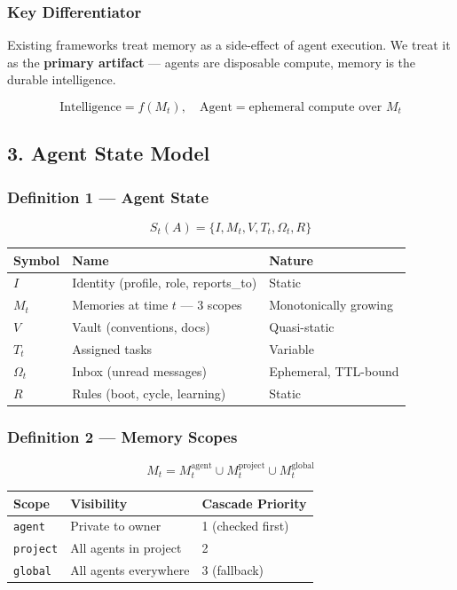 \documentclass[11pt]{article}
\begin{document}
\subsubsection{Key Differentiator}\label{key-differentiator}

Existing frameworks treat memory as a side-effect of agent execution. We
treat it as the \textbf{primary artifact} --- agents are disposable
compute, memory is the durable intelligence.

\[\text{Intelligence} = f(M_t), \quad \text{Agent} = \text{ephemeral compute over } M_t\]

    \subsection{3. Agent State Model}\label{agent-state-model}

\subsubsection{Definition 1 --- Agent
State}\label{definition-1-agent-state}

\[S_t(A) = \{ I, M_t, V, T_t, \Omega_t, R \}\]

\begin{longtable}[]{@{}lll@{}}
\toprule\noalign{}
Symbol & Name & Nature \\
\midrule\noalign{}
\endhead
\bottomrule\noalign{}
\endlastfoot
\(I\) & Identity (profile, role, reports\_to) & Static \\
\(M_t\) & Memories at time \(t\) --- 3 scopes & Monotonically growing \\
\(V\) & Vault (conventions, docs) & Quasi-static \\
\(T_t\) & Assigned tasks & Variable \\
\(\Omega_t\) & Inbox (unread messages) & Ephemeral, TTL-bound \\
\(R\) & Rules (boot, cycle, learning) & Static \\
\end{longtable}

\subsubsection{Definition 2 --- Memory
Scopes}\label{definition-2-memory-scopes}

\[M_t = M_t^{\text{agent}} \cup M_t^{\text{project}} \cup M_t^{\text{global}}\]

\begin{longtable}[]{@{}lll@{}}
\toprule\noalign{}
Scope & Visibility & Cascade Priority \\
\midrule\noalign{}
\endhead
\bottomrule\noalign{}
\endlastfoot
\texttt{agent} & Private to owner & 1 (checked first) \\
\texttt{project} & All agents in project & 2 \\
\texttt{global} & All agents everywhere & 3 (fallback) \\
\end{longtable}
\end{document}
